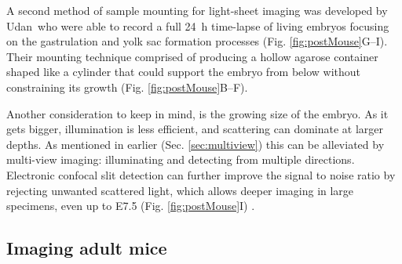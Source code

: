     A second method of sample mounting for light-sheet imaging was developed by Udan~\etal who were able to record a full \SI{24}{h} time-lapse of living embryos focusing on the gastrulation and yolk sac formation processes (Fig. \ref{fig:postMouse}G--I). Their mounting technique comprised of producing a hollow agarose container shaped like a cylinder that could support the embryo from below without constraining its growth (Fig. \ref{fig:postMouse}B--F).

    Another consideration to keep in mind, is the growing size of the embryo. As it gets bigger, illumination is less efficient, and scattering can dominate at larger depths. As mentioned in earlier (Sec. \ref{sec:multiview}) this can be alleviated by multi-view imaging: illuminating and detecting from multiple directions. Electronic confocal slit detection can further improve the signal to noise ratio by rejecting unwanted scattered light, which allows deeper imaging in large specimens, even up to E7.5 (Fig. \ref{fig:postMouse}I) \cite{de_medeiros_confocal_2015}.

  \subsection{Imaging adult mice}
    
